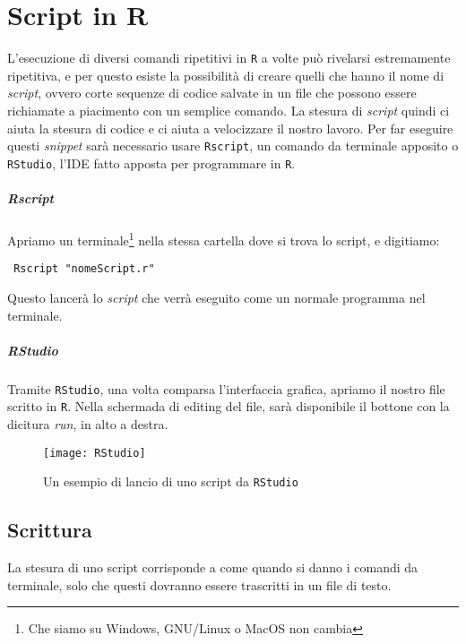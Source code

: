 \chapter{Script in R}

L'esecuzione di diversi comandi ripetitivi in \texttt{R} a volte può rivelarsi 
estremamente ripetitiva, e per questo esiste la possibilità di creare quelli che 
hanno il nome di \textit{script}, ovvero corte sequenze di codice salvate in un 
file che possono essere richiamate a piacimento con un semplice comando.
La stesura di \textit{script} quindi ci aiuta la stesura di codice e ci aiuta a 
velocizzare il nostro lavoro. Per far eseguire questi \textit{snippet} sarà 
necessario usare \texttt{Rscript}, un comando da terminale apposito o 
\texttt{RStudio}, l'IDE fatto apposta per programmare in \texttt{R}.

\paragraph*{Rscript} Apriamo un terminale\footnote{Che siamo su Windows, 
GNU/Linux o MacOS non cambia} nella stessa cartella dove si trova lo script, e 
digitiamo:
\begin{lstlisting}
 Rscript "nomeScript.r"
\end{lstlisting}
Questo lancerà lo \textit{script} che verrà eseguito come un normale programma 
nel terminale.

\paragraph*{RStudio} Tramite \texttt{RStudio}, una volta comparsa l'interfaccia 
grafica, apriamo il nostro file scritto in \texttt{R}. Nella schermada di 
editing del file, sarà disponibile il bottone con la dicitura \textit{run}, in 
alto a destra.

\begin{figure}[h]
  \centering
  \texttt{[image: RStudio]}
  \caption{Un esempio di lancio di uno script da \texttt{RStudio}}
\end{figure}

\section{Scrittura}

La stesura di uno script corrisponde a come quando si danno i comandi da 
terminale, solo che questi dovranno essere trascritti in un file di testo.